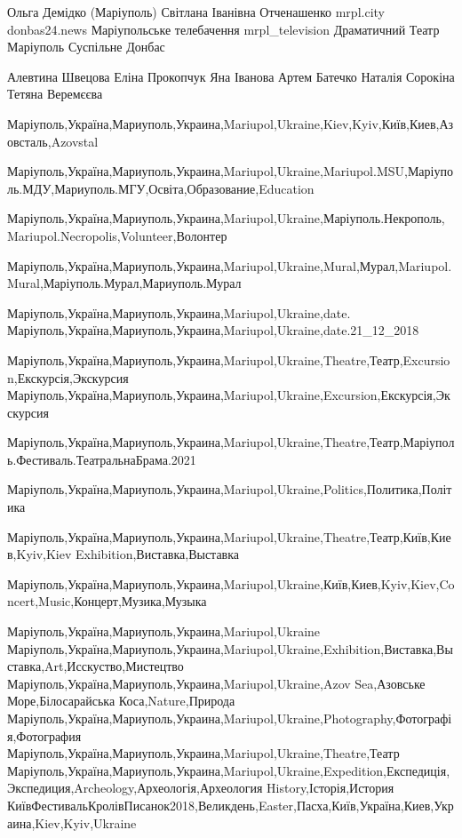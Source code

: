  
 
 
 
 

Ольга Демідко (Маріуполь)
Світлана Іванівна Отченашенко
mrpl.city
donbas24.news
Маріупольське телебачення mrpl_television
Драматичний Театр Маріуполь
Суспільне Донбас

Алевтина Швецова
Еліна Прокопчук
Яна Іванова
Артем Батечко
Наталія Сорокіна
Тетяна Веремєєва

Маріуполь,Україна,Мариуполь,Украина,Mariupol,Ukraine,Kiev,Kyiv,Київ,Киев,Азовсталь,Azovstal

Маріуполь,Україна,Мариуполь,Украина,Mariupol,Ukraine,Mariupol.MSU,Маріуполь.МДУ,Мариуполь.МГУ,Освіта,Образование,Education

Маріуполь,Україна,Мариуполь,Украина,Mariupol,Ukraine,Маріуполь.Некрополь,Mariupol.Necropolis,Volunteer,Волонтер

Маріуполь,Україна,Мариуполь,Украина,Mariupol,Ukraine,Mural,Мурал,Mariupol.Mural,Маріуполь.Мурал,Мариуполь.Мурал

Маріуполь,Україна,Мариуполь,Украина,Mariupol,Ukraine,date.
Маріуполь,Україна,Мариуполь,Украина,Mariupol,Ukraine,date.21_12_2018

Маріуполь,Україна,Мариуполь,Украина,Mariupol,Ukraine,Theatre,Театр,Excursion,Екскурсія,Экскурсия
Маріуполь,Україна,Мариуполь,Украина,Mariupol,Ukraine,Excursion,Екскурсія,Экскурсия

Маріуполь,Україна,Мариуполь,Украина,Mariupol,Ukraine,Theatre,Театр,Маріуполь.Фестиваль.ТеатральнаБрама.2021

Маріуполь,Україна,Мариуполь,Украина,Mariupol,Ukraine,Politics,Политика,Політика

Маріуполь,Україна,Мариуполь,Украина,Mariupol,Ukraine,Theatre,Театр,Київ,Киев,Kyiv,Kiev
Exhibition,Виставка,Выставка

Маріуполь,Україна,Мариуполь,Украина,Mariupol,Ukraine,Київ,Киев,Kyiv,Kiev,Concert,Music,Концерт,Музика,Музыка

Маріуполь,Україна,Мариуполь,Украина,Mariupol,Ukraine
Маріуполь,Україна,Мариуполь,Украина,Mariupol,Ukraine,Exhibition,Виставка,Выставка,Art,Исскуство,Мистецтво
Маріуполь,Україна,Мариуполь,Украина,Mariupol,Ukraine,Azov Sea,Азовське Море,Білосарайська Коса,Nature,Природа
Маріуполь,Україна,Мариуполь,Украина,Mariupol,Ukraine,Photography,Фотографія,Фотография
Маріуполь,Україна,Мариуполь,Украина,Mariupol,Ukraine,Theatre,Театр
Маріуполь,Україна,Мариуполь,Украина,Mariupol,Ukraine,Expedition,Експедиція,Экспедиция,Archeology,Археологія,Археология
History,Історія,История
КиївФестивальКролівПисанок2018,Великдень,Easter,Пасха,Київ,Україна,Киев,Украина,Kiev,Kyiv,Ukraine


